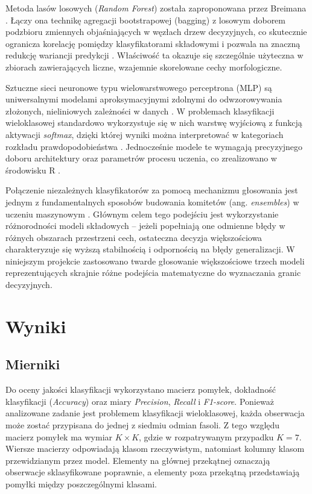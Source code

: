 \documentclass{report}
\begin{document}
Metoda lasów losowych (\textit{Random Forest}) została zaproponowana przez Breimana \cite{breiman2001}. Łączy ona technikę agregacji bootstrapowej (bagging) z losowym doborem podzbioru zmiennych objaśniających w węzłach drzew decyzyjnych, co skutecznie ogranicza korelację pomiędzy klasyfikatorami składowymi i pozwala na znaczną redukcję wariancji predykcji \cite{hastie2009}. Właściwość ta okazuje się szczególnie użyteczna w zbiorach zawierających liczne, wzajemnie skorelowane cechy morfologiczne.

Sztuczne sieci neuronowe typu wielowarstwowego perceptrona (MLP) są uniwersalnymi modelami aproksymacyjnymi zdolnymi do odwzorowywania złożonych, nieliniowych zależności w danych \cite{koronacki2005}. W problemach klasyfikacji wieloklasowej standardowo wykorzystuje się w nich warstwę wyjściową z funkcją aktywacji \textit{softmax}, dzięki której wyniki można interpretować w kategoriach rozkładu prawdopodobieństwa \cite{hastie2009}. Jednocześnie modele te wymagają precyzyjnego doboru architektury oraz parametrów procesu uczenia, co zrealizowano w środowisku R \cite{RCoreTeam}.

Połączenie niezależnych klasyfikatorów za pomocą mechanizmu głosowania jest jednym z fundamentalnych sposobów budowania komitetów (ang. \textit{ensembles}) w uczeniu maszynowym \cite{hastie2009}. Głównym celem tego podejściu jest wykorzystanie różnorodności modeli składowych -- jeżeli popełniają one odmienne błędy w różnych obszarach przestrzeni cech, ostateczna decyzja większościowa charakteryzuje się wyższą stabilnością i odpornością na błędy generalizacji. W niniejszym projekcie zastosowano twarde głosowanie większościowe trzech modeli reprezentujących skrajnie różne podejścia matematyczne do wyznaczania granic decyzyjnych.



\chapter{Wyniki}

\section{Mierniki}

Do oceny jakości klasyfikacji wykorzystano macierz pomyłek, dokładność klasyfikacji (\textit{Accuracy}) oraz miary \textit{Precision}, \textit{Recall} i \textit{F1-score}. Ponieważ analizowane zadanie jest problemem klasyfikacji wieloklasowej, każda obserwacja może zostać przypisana do jednej z siedmiu odmian fasoli. Z tego względu macierz pomyłek ma wymiar $K \times K$, gdzie w rozpatrywanym przypadku $K=7$. Wiersze macierzy odpowiadają klasom rzeczywistym, natomiast kolumny klasom przewidzianym przez model. Elementy na głównej przekątnej oznaczają obserwacje sklasyfikowane poprawnie, a elementy poza przekątną przedstawiają pomyłki między poszczególnymi klasami.
\end{document}
